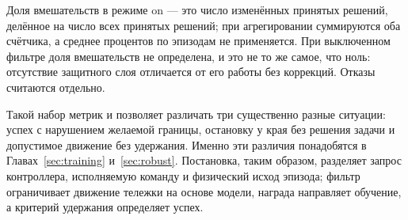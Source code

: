 Доля вмешательств в режиме on — это число изменённых принятых решений, делённое на число всех принятых решений; при агрегировании суммируются оба счётчика, а среднее процентов по эпизодам не применяется. При выключенном фильтре доля вмешательств не определена, и это не то же самое, что ноль: отсутствие защитного слоя отличается от его работы без коррекций. Отказы считаются отдельно.

Такой набор метрик и позволяет различать три существенно разные ситуации: успех с нарушением желаемой границы, остановку у края без решения задачи и допустимое движение без удержания. Именно эти различия понадобятся в Главах~\ref{sec:training} и~\ref{sec:robust}. Постановка, таким образом, разделяет запрос контроллера, исполняемую команду и физический исход эпизода; фильтр ограничивает движение тележки на основе модели, награда направляет обучение, а критерий удержания определяет успех.
